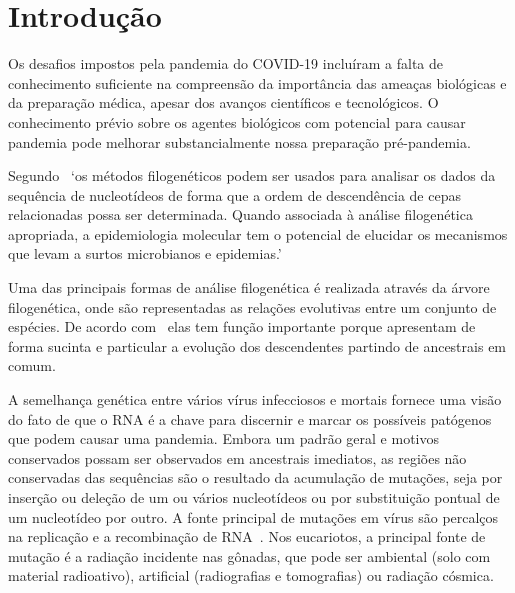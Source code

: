 
\chapter{Introdução}

\setlength{\parskip}{0.3cm}

Os desafios impostos pela pandemia do COVID-19 incluíram a falta de conhecimento suficiente na compreensão da importância das ameaças biológicas e da preparação médica, apesar dos avanços científicos e tecnológicos. O conhecimento prévio sobre os agentes biológicos com potencial para causar pandemia pode melhorar substancialmente nossa preparação pré-pandemia.~\cite[p. 1]{behl_threat_2022}

Segundo~\cite[p.1]{barry_phylogenetic_analysis_2006} `os métodos filogenéticos podem ser usados para analisar os dados da sequência de nucleotídeos de forma que a ordem de descendência de cepas relacionadas possa ser determinada. Quando associada à análise filogenética apropriada, a epidemiologia molecular tem o potencial de elucidar os mecanismos que levam a surtos microbianos e epidemias.'

Uma das principais formas de análise filogenética é realizada através da árvore filogenética, onde são representadas as relações evolutivas entre um conjunto de espécies. De acordo com~\cite{morrison_tree_thinking} elas tem função importante porque apresentam de forma sucinta e particular a evolução dos descendentes partindo de ancestrais em comum.

A semelhança genética entre vários vírus infecciosos e mortais fornece uma visão do fato de que o RNA é a chave para discernir e marcar os possíveis patógenos que podem causar uma pandemia. Embora um padrão geral e motivos conservados possam ser observados em ancestrais imediatos, as regiões não conservadas das sequências são o resultado da acumulação de mutações, seja por inserção ou deleção de um ou vários nucleotídeos ou por substituição pontual de um nucleotídeo por outro. A fonte principal de mutações em vírus são percalços na replicação e a recombinação de RNA~\cite[p. 11]{behl_threat_2022}. Nos eucariotos, a principal fonte de mutação é a radiação incidente nas gônadas, que pode ser ambiental (solo com material radioativo), artificial (radiografias e tomografias) ou radiação cósmica.

